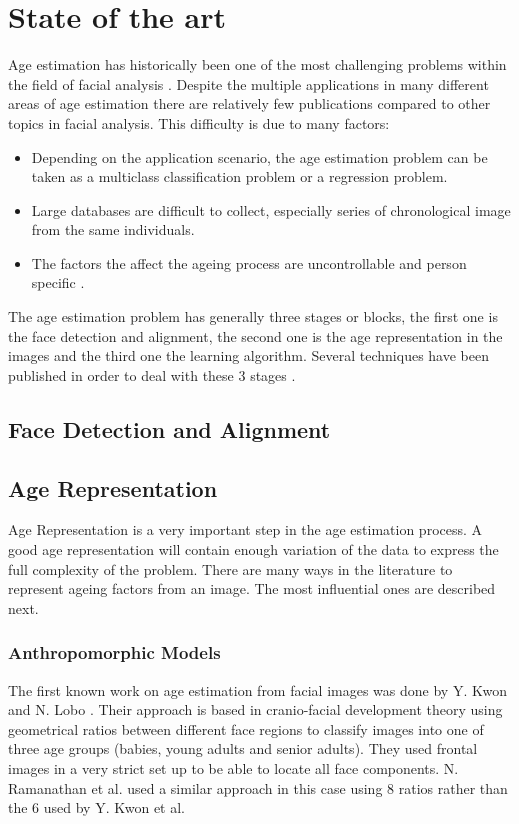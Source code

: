\chapter{State of the art} \label{chap:sota}

Age estimation has historically been one of the most challenging problems within the field of facial analysis \cite{5406526}\cite{han:age}. Despite the multiple applications in many different areas of age estimation there are relatively few publications compared to other topics in facial analysis. This difficulty is due to many factors: 
\begin{itemize}
	\item Depending on the application scenario, the age estimation problem can be taken as a multiclass classification problem or a regression problem.
	\item Large databases are difficult to collect, especially series of chronological image from the same individuals.
	\item The factors the affect the ageing process are uncontrollable and person specific \cite{4284917}\cite{4359348}\cite{1709980}.
\end{itemize}

The age estimation problem has generally three stages or blocks, the first one is the face detection and alignment, the second one is the age representation in the images and the third one the learning algorithm. Several techniques have been published in order to deal with these 3 stages \cite{5406526}.

\section{Face Detection and Alignment}
\section{Age Representation}

Age Representation is a very important step in the age estimation process. A good age representation will contain enough variation of the data to express the full complexity of the problem. There are many ways in the literature to represent ageing factors from an image. The most influential ones are described next.

\subsection{Anthropomorphic Models}
The first known work on age estimation from facial images was done by Y. Kwon and N. Lobo \cite{Kwon:1999:ACF:311844.311845}. Their approach is based in cranio-facial development theory using geometrical ratios between different face regions to classify images into one of three age groups (babies, young adults and senior adults). They used frontal images in a very strict set up to be able to locate all face components. N. Ramanathan et al. \cite{1640784, Ramanathan2009131} used a similar approach in this case using 8 ratios rather than the 6 used by Y. Kwon et al.

